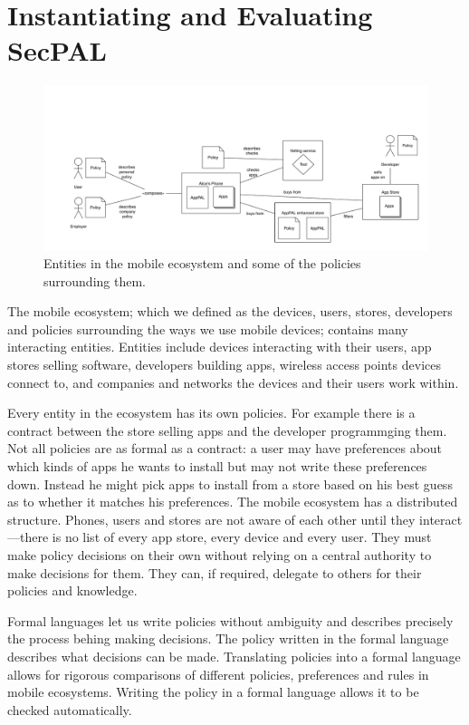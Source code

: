 \documentclass[thesis.tex]{subfiles}
\begin{document}
\chapter{Instantiating and Evaluating SecPAL}
\label{chap:apppal}

\begin{figure}
  \centering
  \includegraphics[width=\textwidth]{figures/policies-ecosystem.pdf}
  \caption[Entities in the mobile ecosystem]{Entities in the mobile ecosystem
    and some of the policies surrounding them.}
  \label{fig:ecosystem}
\end{figure}

The mobile ecosystem; which we defined as the devices, users, stores, developers
and policies surrounding the ways we use mobile devices; contains many
interacting entities. Entities include devices interacting with their users, app
stores selling software, developers building apps, wireless access points
devices connect to, and companies and networks the devices and their users work
within.

Every entity in the ecosystem has its own policies. For example there is a
contract between the store selling apps and the developer programmging them. Not
all policies are as formal as a contract: a user may have preferences about
which kinds of apps he wants to install but may not write these preferences
down. Instead he might pick apps to install from a store based on his
best guess as to whether it matches his preferences. The mobile ecosystem has
a distributed structure. Phones, users and stores are not aware of each other
until they interact---there is no list of every app store, every device and
every user. They must make policy decisions on their own without relying on a
central authority to make decisions for them. They can, if required, delegate to
others for their policies and knowledge.

Formal languages let us write policies without ambiguity and describes precisely
the process behing making decisions. The policy written in the formal language
describes what decisions can be made. Translating policies into a formal
language allows for rigorous comparisons of different policies, preferences and
rules in mobile ecosystems. Writing the policy in a formal language allows it to
be checked automatically.
\end{document}
